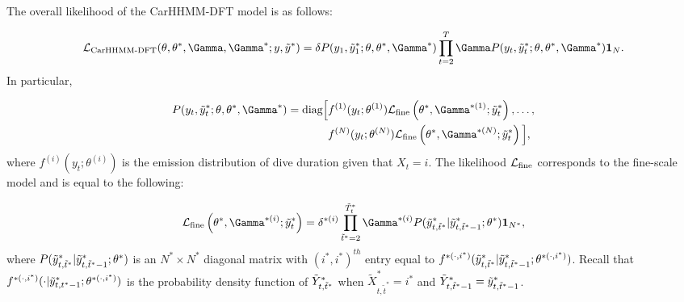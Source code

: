 The overall likelihood of the CarHHMM-DFT model is as follows:

\[\calL_{\text{CarHHMM-DFT}}(\theta,\theta^*,\Gamma,\Gamma^*;y,\z) = \delta P(y_1,\z_1;\theta,\theta^*,\Gamma^*) \prod_{t=2}^T \Gamma P(y_t,\z_t;\theta,\theta^*,\Gamma^*) \mathbf{1}_N.\]
%
In particular,

\begin{align*}
P(y_t,\z_t;\theta,\theta^*,\Gamma^*)  = \text{diag}\Big[&f^{(1)}(y_t;\theta^{(1)})\calL_{\text{fine}}\left(\theta^*,\Gamma^{*(1)};\z_t\right), \ldots , \\
&f^{(N)}(y_t;\theta^{(N)})\calL_{\text{fine}}\left(\theta^*,\Gamma^{*(N)};\z_t\right) \Big],
\end{align*}
%
where $f^{(i)}(y_t;\theta^{(i)})$ is the emission distribution of dive duration given that $X_t = i$. The likelihood $\mathcal{L}_{\text{fine}}$ corresponds to the fine-scale model and is equal to the following:

\[\calL_{\text{fine}}\left(\theta^{*},\Gamma^{*(i)};\z_t\right) = \delta^{*(i)} \prod_{\tilde t^* = 2}^{\tilde T^*_t} \Gamma^{*(i)} P(\z_{t,\tilde t^*}|\z_{t,\tilde t^*-1};\theta^*) \mathbf{1}_{N^*},\]
%
where $P(\tilde{y}^*_{t,\tilde t^*}|\tilde{y}^*_{t,\tilde t^*-1};\theta^*)$ is an $N^* \times N^*$ diagonal matrix with $(i^*,i^*)^{th}$ entry equal to $f^{*(\cdot,i^*)}(\tilde{y}^*_{t,\tilde t^*}|\tilde{y}^*_{t,\tilde t^*-1}; \theta^{*(\cdot,i^*)})$.
%
Recall that $f^{*(\cdot,i^*)}(\cdot|\tilde{y}^*_{t,t^*-1}; \theta^{*(\cdot,i^*)})$ is the probability density function of $\tilde{Y}^*_{t,\tilde t^*}$ when $\tilde X^*_{t,\tilde t^*} = i^*$ and $\tilde{Y}^*_{t,\tilde t^*-1} = \tilde{y}^*_{t,\tilde t^*-1}$.


